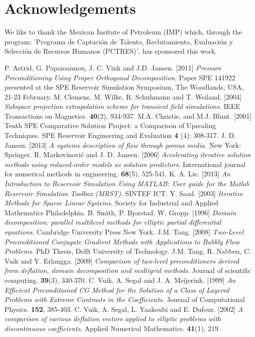 \documentclass{ecmorXV}
\begin{document}
\section{Acknowledgements}

We like to thank the Mexican Insitute of Petroleum (IMP) which, through the program:  
'Programa de Captaci\'on de Talento, Reclutamiento, Evaluaci\'on y Selecci\'on de Recursos Humanos (PCTRES)',
has sponsored this work.


 \begin{thebibliography}{6pt}
P. Astrid, G. Papaioannou, J. C. Vink and J.D. Jansen. [2011]
\textit{Pressure Preconditioning Using Proper Orthogonal Decomposition}.
Paper SPE 141922 presented at the SPE Reservoir Simulation Symposium, The Woodlands, USA, 
21-23 February.
M. Clemens, M. Wilke, R. Schuhmann and T. Weiland. [2004]
\textit{Subspace projection extrapolation scheme for transient field simulations}.
IEEE Transactions on Magnetics. \textbf{40}(2), 934-937.
M.A. Christie, and M.J. Blunt. [2001] Tenth SPE Comparative Solution Project: 
a Comparison of Upscaling Techniques. 
SPE Reservoir Engineering and Evaluation \textbf{4} (4): 308-317.
J. D. Jansen. [2013]
\textit{A systems description of flow through porous media.}
New York: Springer.
R. Markovinovi{\'c} and J. D. Jansen. [2006]
\textit{Accelerating iterative solution methods using reduced-order models as solution predictors}.
International journal for numerical methods in engineering. \textbf{68}(5), 525-541.
K. A. Lie. [2013]
\textit{An Introduction to Reservoir Simulation Using MATLAB:
    User guide for the Matlab Reservoir Simulation Toolbox (MRST)}.
SINTEF ICT.
Y. Saad. [2003]
\textit{Iterative Methods for Sparse Linear Systems}.
Society for Industrial and Applied Mathematics Philadelphia. 
B. Smith, P.  Bjorstad, W. Gropp. [1996]
\textit{Domain decomposition: parallel multilevel methods for elliptic partial differential equations}.
Cambridge University Press New York. 
J.M. Tang. [2008]
\textit{Two-Level Preconditioned Conjugate Gradient Methods with Applications to 
       Bubbly Flow Problems}. PhD Thesis, Delft University of Technology. 
J.M. Tang, R. Nabben, C. Vuik and Y. Erlangga. [2009]
\textit{Comparison of two-level preconditioners derived from deflation, domain decomposition and multigrid methods}.
Journal of scientific computing. \textbf{39}(3), 340-370.
C. Vuik, A. Segal and J. A. Meijerink. [1999]
\textit{An Efficient Preconditioned CG Method for the
                  Solution of a Class of Layered Problems with
                  Extreme Contrasts in the Coefficients}.
Journal of Computational Physics. \textbf{152}, 385-403.
C. Vuik, A. Segal, L.  Yaakoubi and E. Dufour. [2002]
\textit{A comparison of various deflation vectors applied 
    to elliptic problems with discontinuous coefficients}.
Applied Numerical Mathematics. \textbf{41}(1), 219. 

\end{thebibliography}
%


\end{document}
